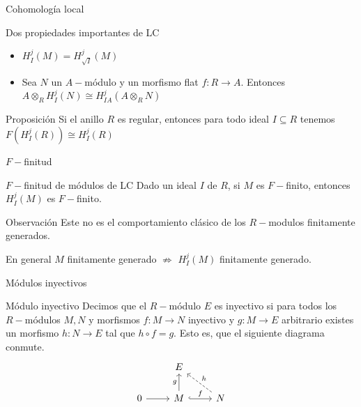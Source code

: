 \documentclass{beamer}
\begin{document}
\begin{frame}[fragile]{Cohomología local}
\begin{block}{Dos propiedades importantes de LC}
\begin{itemize}
  \item $H^j_I(M) = H^j_{\sqrt{I} }(M)$ 
  \item Sea $N$ un $A-$módulo y un morfismo flat $f:R\to A$. Entonces $A\otimes _RH^j_I(N) \cong H_{IA}^j(A\otimes_R N)$
\end{itemize}
\end{block}
\begin{block}{Proposición}
 Si el anillo $R$ es regular, entonces para todo ideal $I\subseteq R$ tenemos $F(H_I^j(R)) \cong  H_{I}^j(R)$
\end{block}
\end{frame}


\begin{frame}[fragile]{$F-$finitud}
  \begin{block}{$F-$finitud de módulos de LC}
Dado un ideal $I$ de $R$, si $M$ es $F-$finito, entonces $H^j_I(M)$ es $F-$finito.
\end{block}
  \begin{block}{Observación}
	Este no es el comportamiento clásico de los $R-$modulos finitamente generados. 

	En general $M$ finitamente generado  $\nRightarrow $ $H_I^j(M)$ finitamente generado.
\end{block}
\end{frame}


\begin{frame}[fragile]{Módulos inyectivos}
\begin{block}{Módulo inyectivo}
  Decimos que el $R-$módulo  $E$ es inyectivo si para todos los  $R-$módulos  $M, N$ y morfismos $f:M\to N$ inyectivo y $g:M\to E$ arbitrario existes un morfismo $h:N\to E$ tal que $h\circ f=g$. Esto es, que el siguiente diagrama conmute.
\[\begin{tikzcd}
	& E \\
	0 & M & N
	\arrow[from=2-1, to=2-2]
	\arrow["g", from=2-2, to=1-2]
	\arrow["f", hook, from=2-2, to=2-3]
	\arrow["h"', dashed, from=2-3, to=1-2]
\end{tikzcd}\]
\end{block}
\end{frame}
\end{document}
